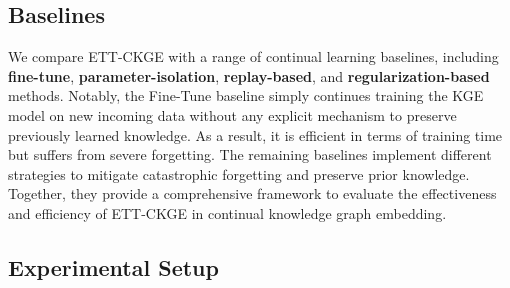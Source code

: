 \documentclass[runningheads]{llncs}
\begin{document}
\subsection{Baselines}

We compare ETT-CKGE with a range of continual learning baselines, including \textbf{fine-tune}, \textbf{parameter-isolation}, \textbf{replay-based}, and \textbf{regularization-based} methods. Notably, the Fine-Tune baseline simply continues training the KGE model on new incoming data without any explicit mechanism to preserve previously learned knowledge. As a result, it is efficient in terms of training time but suffers from severe forgetting. The remaining baselines implement different strategies to mitigate catastrophic forgetting and preserve prior knowledge. Together, they provide a comprehensive framework to evaluate the effectiveness and efficiency of ETT-CKGE in continual knowledge graph embedding.




\subsection{Experimental Setup}
\end{document}
